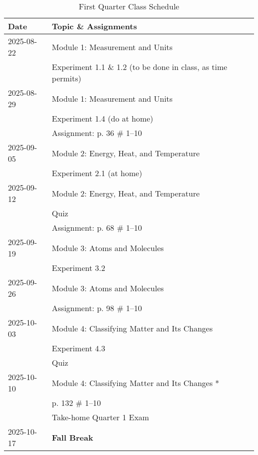 \documentclass[11pt, oneside]{article}   	%
\begin{document}
\begin{table}[h]
\centering
\begin{tabular}{ l | l }
Date & Topic \& Assignments \\
\hline
2025-08-22 & Module 1:  Measurement and Units \\
                   & Experiment 1.1 \& 1.2 (to be done in class, as time permits) \\

\hline

2025-08-29 & Module 1:  Measurement and Units \\
                   & Experiment 1.4 (do at home) \\
                   & Assignment: p. 36 \# 1--10 \\
\hline

2025-09-05 & Module 2: Energy, Heat, and Temperature \\
                   & Experiment 2.1 (at home) \\
\hline

2025-09-12 & Module 2: Energy, Heat, and Temperature \\
	           & Quiz \\
	           & Assignment: p. 68 \# 1--10 \\ 
\hline

2025-09-19 & Module 3: Atoms and Molecules \\
                   & Experiment 3.2 \\
\hline

2025-09-26 & Module 3: Atoms and Molecules \\
                   & Assignment: p. 98 \# 1--10 \\ 
\hline

2025-10-03 & Module 4: Classifying Matter and Its Changes \\
                    & Experiment 4.3 \\
                    & Quiz \\
\hline

2025-10-10 & Module 4: Classifying Matter and Its Changes * \\
                   & p. 132 \# 1--10 \\
                   & Take-home Quarter 1 Exam \\
\hline

2025-10-17 & \textbf{Fall Break} \\

\end{tabular}
\caption{First Quarter Class Schedule}\label{table:class-schedule-q1}
\end{table}
\end{document}
